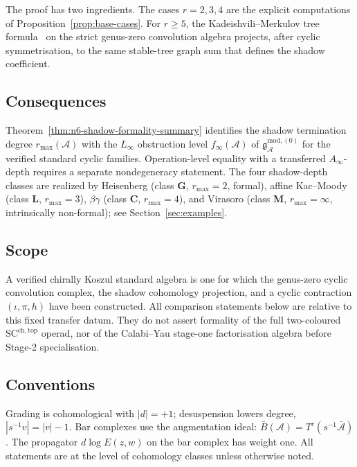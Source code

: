\documentclass[11pt,reqno]{amsart}
\theoremstyle{definition}
\theoremstyle{remark}
\providecommand{\cA}{\mathcal{A}}
\providecommand{\barB}{\bar{B}}
\providecommand{\gmodzero}{\mathfrak{g}^{\mathrm{mod},(0)}_{\cA}}
\providecommand{\Linf}{L_\infty}
\providecommand{\Ainf}{A_\infty}
\numberwithin{equation}{section}
\begin{document}
The proof has two ingredients. The cases $r=2,3,4$ are the
explicit computations of Proposition~\ref{prop:base-cases}. For
$r\ge 5$, the Kadeishvili--Merkulov tree
formula~\cite{Kadeishvili80,Merkulov99} on the strict genus-zero
convolution algebra projects, after cyclic symmetrisation, to the
same stable-tree graph sum that defines the shadow coefficient.

\subsection{Consequences}

Theorem~\ref{thm:n6-shadow-formality-summary} identifies the shadow termination degree
$r_{\max}(\cA)$ with the $\Linf$ obstruction level
$f_\infty(\cA)$ of $\gmodzero$ for the verified standard cyclic
families. Operation-level equality with a transferred
$\Ainf$-depth requires a separate nondegeneracy statement.
The four shadow-depth classes are realized by Heisenberg (class
\textbf{G}, $r_{\max}=2$, formal), affine Kac--Moody (class
\textbf{L}, $r_{\max}=3$), $\beta\gamma$ (class \textbf{C},
$r_{\max}=4$), and Virasoro (class \textbf{M},
$r_{\max}=\infty$, intrinsically non-formal); see
Section~\ref{sec:examples}.

\subsection*{Scope}

A verified chirally Koszul standard algebra is one for which the
genus-zero cyclic convolution complex, the shadow cohomology
projection, and a cyclic contraction
$(\iota,\pi,h)$ have been constructed. All comparison statements
below are relative to this fixed transfer datum.
They do not assert formality of the full two-coloured
$\mathrm{SC}^{\mathrm{ch,top}}$ operad, nor of the Calabi--Yau
stage-one factorisation algebra before Stage-2 specialisation.

\subsection*{Conventions}

Grading is cohomological with $|d|=+1$; desuspension lowers
degree, $|s^{-1}v|=|v|-1$. Bar complexes use the augmentation
ideal: $\barB(\cA)=T^c(s^{-1}\bar{\cA})$. The propagator
$d\log E(z,w)$ on the bar complex has weight one. All statements
are at the level of cohomology classes unless otherwise noted.

\end{document}
